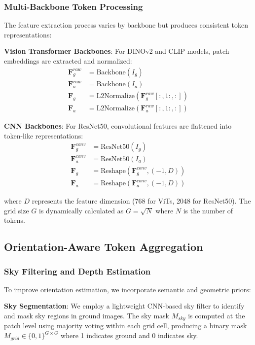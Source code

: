 \subsubsection{Multi-Backbone Token Processing}

The feature extraction process varies by backbone but produces consistent token representations:

\textbf{Vision Transformer Backbones}: For DINOv2 and CLIP models, patch embeddings are extracted and normalized:
\begin{align}
\mathbf{F}_g^{raw} &= \text{Backbone}(I_g) \\
\mathbf{F}_a^{raw} &= \text{Backbone}(I_a) \\
\mathbf{F}_g &= \text{L2Normalize}(\mathbf{F}_g^{raw}[:, 1:, :]) \\
\mathbf{F}_a &= \text{L2Normalize}(\mathbf{F}_a^{raw}[:, 1:, :])
\end{align}

\textbf{CNN Backbones}: For ResNet50, convolutional features are flattened into token-like representations:
\begin{align}
\mathbf{F}_g^{conv} &= \text{ResNet50}(I_g) \\
\mathbf{F}_a^{conv} &= \text{ResNet50}(I_a) \\
\mathbf{F}_g &= \text{Reshape}(\mathbf{F}_g^{conv}, (-1, D)) \\
\mathbf{F}_a &= \text{Reshape}(\mathbf{F}_a^{conv}, (-1, D))
\end{align}

where $D$ represents the feature dimension (768 for ViTs, 2048 for ResNet50). The grid size $G$ is dynamically calculated as $G = \sqrt{N}$ where $N$ is the number of tokens.

\subsection{Orientation-Aware Token Aggregation}

\subsubsection{Sky Filtering and Depth Estimation}

To improve orientation estimation, we incorporate semantic and geometric priors:

\textbf{Sky Segmentation}: We employ a lightweight CNN-based sky filter to identify and mask sky regions in ground images. The sky mask $M_{sky}$ is computed at the patch level using majority voting within each grid cell, producing a binary mask $M_{grid} \in \{0,1\}^{G \times G}$ where 1 indicates ground and 0 indicates sky.

